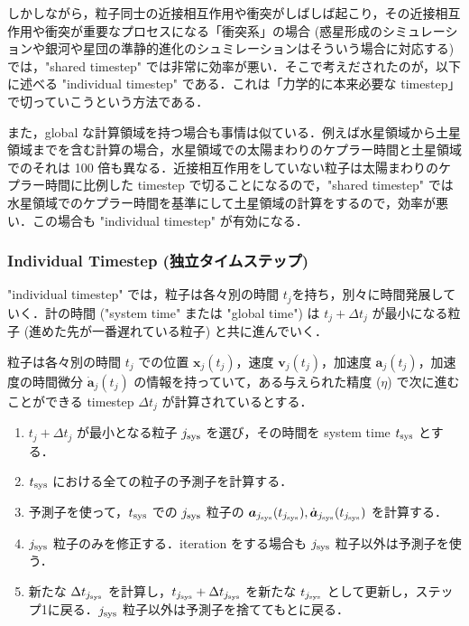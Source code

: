 \documentclass[11pt,a4paper,oneside,onecolumn]{jreport}
\begin{document}
しかしながら，粒子同士の近接相互作用や衝突がしばしば起こり，その近接相互作用や衝突が重要なプロセスになる「衝突系」の場合 (惑星形成のシミュレーションや銀河や星団の準静的進化のシュミレーションはそういう場合に対応する) では，"shared timestep" では非常に効率が悪い．そこで考えだされたのが，以下に述べる "individual timestep" である．これは「力学的に本来必要な timestep」で切っていこうという方法である．

また，global な計算領域を持つ場合も事情は似ている．例えば水星領域から土星領域までを含む計算の場合，水星領域での太陽まわりのケプラー時間と土星領域でのそれは 100 倍も異なる．近接相互作用をしていない粒子は太陽まわりのケプラー時間に比例した timestep で切ることになるので，"shared timestep" では水星領域でのケプラー時間を基準にして土星領域の計算をするので，効率が悪い．この場合も "individual timestep" が有効になる．

\subsubsection{Individual Timestep (独立タイムステップ) }
"individual timestep" では，粒子は各々別の時間 $t_j$を持ち，別々に時間発展していく．計の時間 ("system time" または "global time") は $t_j + \Delta t_j$ が最小になる粒子 (進めた先が一番遅れている粒子) と共に進んでいく．

粒子は各々別の時間 $t_j$ での位置 ${\bm x}_j (t_j)$，速度 ${\bm v}_j (t_j)$，加速度 ${\bm a}_j (t_j)$，加速度の時間微分 $\dot{{\bm a}}_j (t_j)$ の情報を持っていて，ある与えられた精度 ($\eta$) で次に進むことができる timestep $\Delta t_j$ が計算されているとする．

\begin{enumerate}
\item $t_j + \Delta t_j$ が最小となる粒子 $j_{{\rm sys}}$ を選び，その時間を system time $t_{{\rm sys}}$ とする．
\item $t_{{\rm sys}}$ における全ての粒子の予測子を計算する．
\item 予測子を使って，$t_{{\rm sys}}$ での $j_{{\rm sys}}$ 粒子の ${\bm a}_{j_{{\rm sys}}}(t_{j_{{\rm sys}}}), \dot{{\bm a}}_{j_{{\rm sys}}} (t_{j_{{\rm sys}}})$ を計算する．
\item $j_{{\rm sys}}$ 粒子のみを修正する．iteration をする場合も $j_{{\rm sys}}$ 粒子以外は予測子を使う．
\item 新たな $\Delta t_{j_{{\rm sys}}}$  を計算し，$t_{j_{{\rm sys}}} + \Delta t_{j_{{\rm sys}}}$ を新たな $t_{j_{{\rm sys}}}$ として更新し，ステップ1に戻る．$j_{{\rm sys}}$ 粒子以外は予測子を捨ててもとに戻る．
\end{enumerate}
\end{document}
